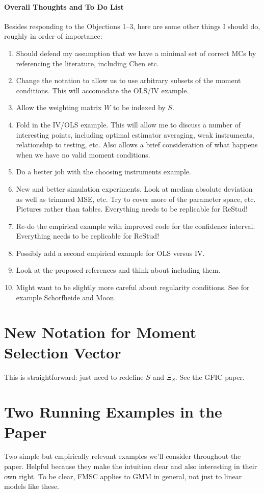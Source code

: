 \documentclass[12pt]{article}\usepackage[]{graphicx}\usepackage[]{color}
\theoremstyle{definition}
\begin{document}
\paragraph{Overall Thoughts and To Do List}
Besides responding to the Objections 1--3, here are some other things I should do, roughly in order of importance:
  \begin{enumerate}
    \item Should defend my assumption that we have a minimal set of correct MCs by referencing the literature, including Chen etc.
    \item Change the notation to allow us to use arbitrary subsets of the moment conditions. This will accomodate the OLS/IV example.
    \item Allow the weighting matrix $W$ to be indexed by $S$.
    \item Fold in the IV/OLS example. This will allow me to discuss a number of interesting points, including optimal estimator averaging, weak instruments, relationship to testing, etc. Also allows a brief consideration of what happens when we have no valid moment conditions.
    \item Do a better job with the choosing instruments example.
    \item New and better simulation experiments. Look at median absolute deviation as well as trimmed MSE, etc. Try to cover more of the parameter space, etc. Pictures rather than tables. Everything needs to be replicable for ReStud!
    \item Re-do the empirical example with improved code for the confidence interval. Everything needs to be replicable for ReStud!
    \item Possibly add a second empirical example for OLS versus IV.
    \item Look at the proposed references and think about including them.
    \item Might want to be slightly more careful about regularity conditions. See for example Schorfheide and Moon.
  \end{enumerate}

\section{New Notation for Moment Selection Vector}
This is straightforward: just need to redefine $S$ and $\Xi_S$. See the GFIC paper.

\section{Two Running Examples in the Paper}
Two simple but empirically relevant examples we'll consider throughout the paper. Helpful because they make the intuition clear and also interesting in their own right. To be clear, FMSC applies to GMM in general, not just to linear models like these.
\end{document}
